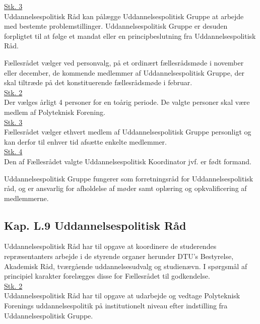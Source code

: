 \underline{Stk. 3}\\
Uddannelsespolitisk Råd kan pålægge Uddannelsespolitisk Gruppe at arbejde med bestemte problemstillinger. Uddannelsespolitisk Gruppe er desuden forpligtet til at følge et mandat eller en
principbeslutning fra Uddannelsespolitisk Råd.\\

\item Fællesrådet vælger ved personvalg, på et ordinært fællesrådsmøde i november eller december, de kommende medlemmer af Uddannelsespolitisk Gruppe, der skal tiltræde på det konstituerende fællesrådsmøde i februar.\\

\underline{Stk. 2}\\
Der vælges årligt 4 personer for en toårig periode. De valgte personer skal være medlem af Polyteknisk Forening.\\

\underline{Stk. 3}\\ Fællesrådet vælger ethvert medlem af Uddannelsespolitisk Gruppe personligt og kan derfor til enhver tid afsætte enkelte medlemmer.\\

\underline{Stk. 4}\\ 
Den af Fællesrådet valgte Uddannelsespolitisk Koordinator jvf.  er født formand.\\

\item Uddannelsespolitisk Gruppe fungerer som forretningsråd for Uddannelsespolitisk råd, og er ansvarlig for afholdelse af møder samt oplæring og opkvalificering af medlemmerne.\\

\subsection*{Kap. L.9 Uddannelsespolitisk Råd}
\label{L:kap:upr}
\item Uddannelsespolitisk Råd har til opgave at koordinere de studerendes repræsentanters arbejde i de styrende organer herunder DTU’s Bestyrelse, Akademisk Råd, tværgående uddannelsesudvalg og studienævn. I spørgsmål af principiel karakter forelægges disse for Fællesrådet til godkendelse.\\

\underline{Stk. 2}\\
Uddannelsespolitisk Råd har til opgave at udarbejde og vedtage Polyteknisk Forenings uddannelsespolitik på institutionelt niveau efter indstilling fra Uddannelsespolitisk Gruppe.\\

